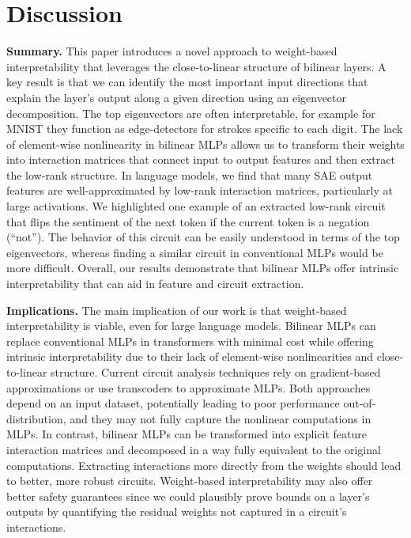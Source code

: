 \documentclass{article} %
\begin{document}
\section{Discussion}
\textbf{Summary.}
This paper introduces a novel approach to weight-based interpretability that leverages the close-to-linear structure of bilinear layers. A key result is that we can identify the most important input directions that explain the layer's output along a given direction using an eigenvector decomposition. The top eigenvectors are often interpretable, for example for MNIST they function as edge-detectors for strokes specific to each digit. The lack of element-wise nonlinearity in bilinear MLPs allows us to transform their weights into interaction matrices that connect input to output features and then extract the low-rank structure. In language models, we find that many SAE output features are well-approximated by low-rank interaction matrices, particularly at large activations. We highlighted one example of an extracted low-rank circuit that flips the sentiment of the next token if the current token is a negation (“not”). The behavior of this circuit can be easily understood in terms of the top eigenvectors, whereas finding a similar circuit in conventional MLPs would be more difficult. Overall, our results demonstrate that bilinear MLPs offer intrinsic interpretability that can aid in feature and circuit extraction. 

\textbf{Implications. } 
The main implication of our work is that weight-based interpretability is viable, even for large language models. Bilinear MLPs can replace conventional MLPs in transformers with minimal cost while offering intrinsic interpretability due to their lack of element-wise nonlinearities and close-to-linear structure. 
Current circuit analysis techniques rely on gradient-based approximations \citep{syed2023attributionpatchingoutperformsautomated, marks2024sparse} or use transcoders \citep{dunefsky2024transcoders} to approximate MLPs. Both approaches depend on an input dataset, potentially leading to poor performance out-of-distribution, and they may not fully capture the nonlinear computations in MLPs. In contrast, bilinear MLPs can be transformed into explicit feature interaction matrices and decomposed in a way fully equivalent to the original computations. Extracting interactions more directly from the weights should lead to better, more robust circuits. Weight-based interpretability may also offer better safety guarantees since we could plausibly prove bounds on a layer's outputs by quantifying the residual weights not captured in a circuit's interactions. 
\end{document}

